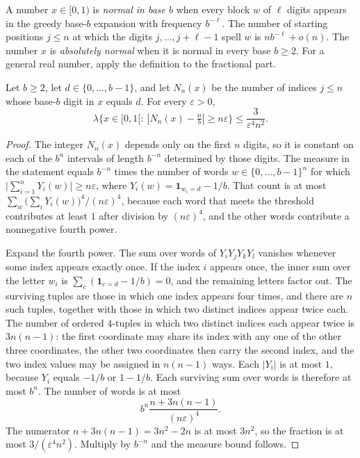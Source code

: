 A number $x\in[0,1)$ is \emph{normal in base $b$} when every block $w$ of $\ell$ digits appears in the greedy base-$b$ expansion with frequency $b^{-\ell}$.
The number of starting positions $j\le n$ at which the digits $j,\ldots,j+\ell-1$ spell $w$ is $n b^{-\ell}+o(n)$.
The number $x$ is \emph{absolutely normal} when it is normal in every base $b\ge2$.
For a general real number, apply the definition to the fractional part.

\begin{lemma}\label{lem:fourth}
Let $b\ge2$, let $d\in\{0,\ldots,b-1\}$, and let $N_n(x)$ be the number of indices $j\le n$ whose base-$b$ digit in $x$ equals $d$.
For every $\varepsilon>0$,
\[\lambda\bigl\{x\in[0,1[:\ |N_n(x)-\tfrac nb|\ge n\varepsilon\bigr\}\le\frac3{\varepsilon^4n^2}.\]
\end{lemma}
\begin{proof}
The integer $N_n(x)$ depends only on the first $n$ digits, so it is constant on each of the $b^n$ intervals of length $b^{-n}$ determined by those digits.
The measure in the statement equals $b^{-n}$ times the number of words $w\in\{0,\ldots,b-1\}^n$ for which $\bigl|\sum_{i=1}^n Y_i(w)\bigr|\ge n\varepsilon$, where $Y_i(w)=\mathbf 1_{w_i=d}-1/b$.
That count is at most $\sum_w\bigl(\sum_i Y_i(w)\bigr)^4/(n\varepsilon)^4$, because each word that meets the threshold contributes at least $1$ after division by $(n\varepsilon)^4$, and the other words contribute a nonnegative fourth power.

Expand the fourth power.
The sum over words of $Y_i Y_j Y_k Y_l$ vanishes whenever some index appears exactly once.
If the index $i$ appears once, the inner sum over the letter $w_i$ is $\sum_c(\mathbf 1_{c=d}-1/b)=0$, and the remaining letters factor out.
The surviving tuples are those in which one index appears four times, and there are $n$ such tuples, together with those in which two distinct indices appear twice each.
The number of ordered $4$-tuples in which two distinct indices each appear twice is $3n(n-1)$: the first coordinate may share its index with any one of the other three coordinates, the other two coordinates then carry the second index, and the two index values may be assigned in $n(n-1)$ ways.
Each $|Y_i|$ is at most $1$, because $Y_i$ equals $-1/b$ or $1-1/b$.
Each surviving sum over words is therefore at most $b^n$.
The number of words is at most
\[
b^n\frac{n+3n(n-1)}{(n\varepsilon)^4}.
\]
The numerator $n+3n(n-1)=3n^2-2n$ is at most $3n^2$, so the fraction is at most $3/(\varepsilon^4 n^2)$.
Multiply by $b^{-n}$ and the measure bound follows.
\end{proof}

